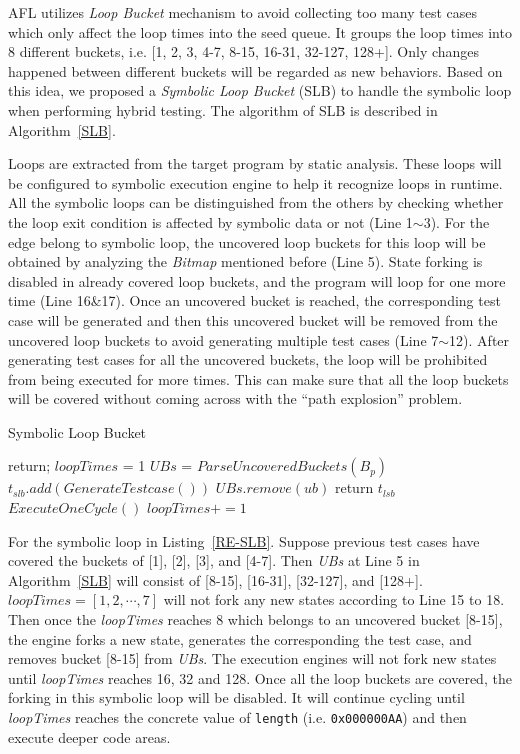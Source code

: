 AFL utilizes \emph{Loop Bucket} mechanism to avoid collecting too many test cases which only affect the loop times into the seed queue. It groups the loop times into 8 different buckets, i.e. [1, 2, 3, 4-7, 8-15, 16-31, 32-127, 128+]. Only changes happened between different buckets will be regarded as new behaviors. Based on this idea, we proposed a \textit{Symbolic Loop Bucket} (SLB) to handle the symbolic loop when performing hybrid testing. The algorithm of SLB is described in Algorithm~\ref{SLB}.

Loops are extracted from the target program by static analysis. These loops will be configured to symbolic execution engine to help it recognize loops in runtime. All the symbolic loops can be distinguished from the others by checking whether the loop exit condition is affected by symbolic data or not (Line 1$\sim$3). For the edge belong to symbolic loop, the uncovered loop buckets for this loop will be obtained by analyzing the \textit{Bitmap} mentioned before (Line 5). 
State forking is disabled in already covered loop buckets, and the program will loop for one more time (Line 16\&17). Once an uncovered bucket is reached, the corresponding test case will be generated and then this uncovered bucket will be removed from the uncovered loop buckets to avoid generating multiple test cases (Line 7$\sim$12). After generating test cases for all the uncovered buckets, the loop will be prohibited from being executed for more times. This can make sure that all the loop buckets will be covered without coming across with the ``path explosion'' problem.

\begin{algorithm}
  \caption{Symbolic Loop Bucket}
  \label{SLB}
  {
    return;
  }
  $loopTimes$ = 1\;
  $UBs$ = $ParseUncoveredBuckets(B_p)$\;
  {
    {
      {
        $t_{slb}.add(GenerateTestcase())$\;
        $UBs$.$remove(ub)$\;
      }
    }
    {
      return $t_{lsb}$\;
    }{
      $ExecuteOneCycle()$\;
      $loopTimes += 1$\;
    }
  }
\end{algorithm}  

For the symbolic loop in Listing~\ref{RE-SLB}. Suppose previous test cases have covered the buckets of [1], [2], [3], and [4-7]. Then \textit{UBs} at Line 5 in Algorithm~\ref{SLB} will consist of [8-15], [16-31], [32-127], and [128+]. $\textit{loopTimes}=[1, 2, \cdots, 7]$ will not fork any new states according to Line 15 to 18. Then once the \textit{loopTimes} reaches 8 which belongs to an uncovered bucket [8-15], the engine forks a new state,  generates the corresponding the test case, and removes bucket [8-15] from \textit{UBs}. The execution engines will not fork new states until \textit{loopTimes} reaches 16, 32 and 128. Once all the loop buckets are covered, the forking in this symbolic loop will be disabled. It will continue cycling until \textit{loopTimes} reaches the concrete value of \texttt{length} (i.e. \texttt{0x000000AA}) and then execute deeper code areas.